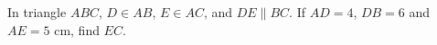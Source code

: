 In triangle $ABC$, $D\in AB$, $E\in AC$, and $DE\parallel BC$. If $AD=4$, $DB=6$ and $AE=5$ cm, find $EC$.
